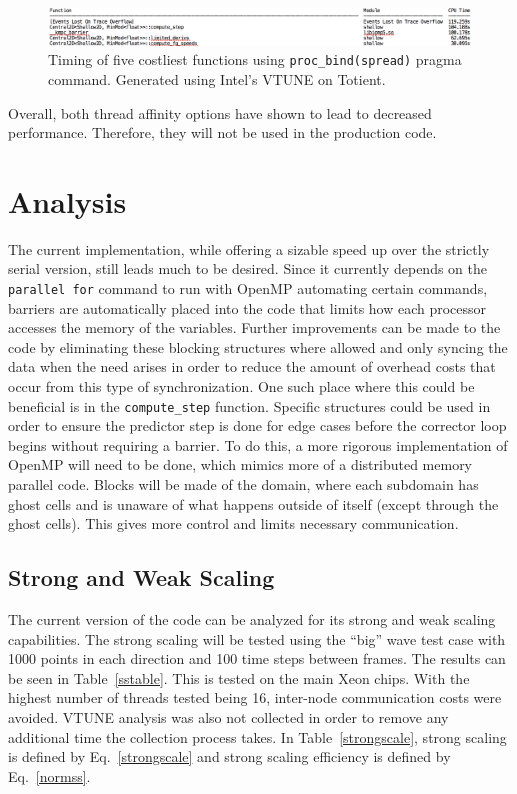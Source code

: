 \documentclass[12pt]{article}
\begin{document}
		\begin{figure}[h]
			\begin{center}
				\includegraphics[width=0.8\columnwidth]{bindspread}
				\caption{Timing of five costliest functions using \texttt{proc\_bind(spread)} pragma command. Generated using Intel's VTUNE on Totient.}
				\label{bindspread}
			\end{center}
		\end{figure}
		
		\noindent Overall, both thread affinity options have shown to lead to decreased performance. Therefore, they will not be used in the production code.
		
\section{Analysis}
The current implementation, while offering a sizable speed up over the strictly serial version, still leads much to be desired. Since it currently depends on the \texttt{parallel for} command to run with OpenMP automating certain commands, barriers are automatically placed into the code that limits how each processor accesses the memory of the variables. Further improvements can be made to the code by eliminating these blocking structures where allowed and only syncing the data when the need arises in order to reduce the amount of overhead costs that occur from this type of synchronization. One such place where this could be beneficial is in the \texttt{compute\_step} function. Specific structures could be used in order to ensure the predictor step is done for edge cases before the corrector loop begins without requiring a barrier. To do this, a more rigorous implementation of OpenMP will need to be done, which mimics more of a distributed memory parallel code. Blocks will be made of the domain, where each subdomain has ghost cells and is unaware of what happens outside of itself (except through the ghost cells). This gives more control and limits necessary communication.

\subsection{Strong and Weak Scaling}
The current version of the code can be analyzed for its strong and weak scaling capabilities. The strong scaling will be tested using the ``big'' wave test case with 1000 points in each direction and 100 time steps between frames. The results can be seen in Table~\ref{sstable}. This is tested on the main Xeon chips. With the highest number of threads tested being 16, inter-node communication costs were avoided. VTUNE analysis was also not collected in order to remove any additional time the collection process takes. In Table~\ref{strongscale}, strong scaling is defined by Eq.~\ref{strongscale} and strong scaling efficiency is defined by Eq.~\ref{normss}.
\end{document}
